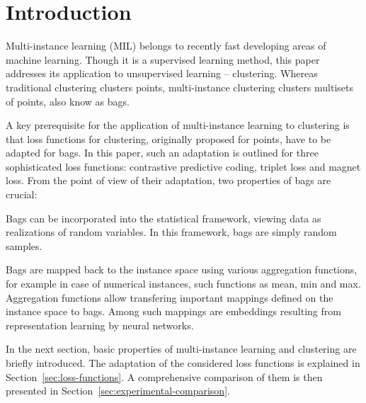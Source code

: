 \section{Introduction}

Multi-instance learning (MIL) belongs to recently fast developing areas of machine learning. Though it is a supervised learning method, this paper addresses its application to unsupervised learning -- clustering.  Whereas traditional clustering clusters points, multi-instance clustering clusters multisets of points, also know as bags.

A key prerequisite for the application of multi-instance learning to clustering is that loss functions for clustering, originally proposed for points, have to be adapted for bags. In this paper, such an adaptation is outlined for three sophisticated loss functions: contrastive predictive coding, triplet loss and magnet loss. From the point of view of their adaptation, two properties of bags are crucial:
\begin{romanitems}
	\item Bags can be incorporated into the statistical framework, viewing data as realizations of random variables. In this framework, bags are simply random samples.
	\item Bags are mapped back to the instance space using various aggregation functions, for example in case of numerical instances, such functions as mean, min and max. Aggregation functions allow transfering important mappings defined on the instance space to bags. Among such mappings are embeddings resulting from representation learning by neural networks.
\end{romanitems}

In the next section, basic properties of multi-instance learning and clustering are briefly introduced. The adaptation of the considered loss functions is explained in Section~\ref{sec:loss-functions}. A comprehensive comparison of them is then presented in Section~\ref{sec:experimental-comparison}.
